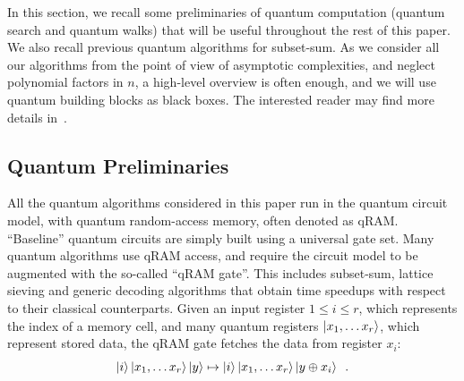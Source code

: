 

In this section, we recall some preliminaries of quantum computation (quantum search and quantum walks) that will be useful throughout the rest of this paper. We also recall previous quantum algorithms for subset-sum. As we consider all our algorithms from the point of view of asymptotic complexities, and neglect polynomial factors in $n$, a high-level overview is often enough, and we will use quantum building blocks as black boxes. The interested reader may find more details in~\cite{nielsen2002quantum}.



\subsection{Quantum Preliminaries}



All the quantum algorithms considered in this paper run in the quantum circuit model, with quantum random-access memory, often denoted as qRAM. ``Baseline'' quantum circuits are simply built using a universal gate set. Many quantum algorithms use qRAM access, and require the circuit model to be augmented with the so-called ``qRAM gate''. This includes subset-sum, lattice sieving and generic decoding algorithms that obtain time speedups with respect to their classical counterparts. Given an input register $1 \leq i \leq r$, which represents the index of a memory cell, and many quantum registers $\left| x_1 , \ldots x_r \right\rangle$, which represent stored data, the qRAM gate fetches the data from register $x_i$:
$$ \left| i \right\rangle \left| x_1 , \ldots x_r \right\rangle \left| y \right\rangle \mapsto \left| i \right\rangle \left| x_1 , \ldots x_r \right\rangle \left| y \oplus x_i \right\rangle \enspace.$$


